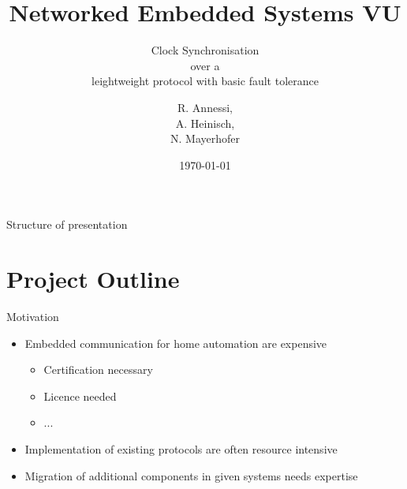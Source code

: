 \documentclass{beamer}
\title {Networked Embedded Systems VU}
\subtitle {Clock Synchronisation\\over a\\ leightweight protocol with basic fault tolerance}
\author{R. Annessi,\\ A. Heinisch,\\ N. Mayerhofer}
\date{\customdate\today}
\begin{document}
\begin{frame}
  \titlepage
\end{frame}
 \logo{}

\begin{frame}{Structure of presentation}
  \tableofcontents
\end{frame}


\section{Project Outline}
\begin{frame}{Motivation}
\begin{center}
\begin{itemize}
  \item Embedded communication for home automation are expensive
    \begin{itemize}
      \item Certification necessary
      \item Licence needed
      \item ...
    \end{itemize}
  \item Implementation of existing protocols are often resource intensive
  \item Migration of additional components in given systems needs expertise
\end{itemize}
\end{center}
\end{frame}
\end{document}
